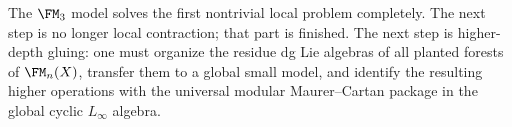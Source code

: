 \begin{remark}
The $\FM_3$ model solves the first nontrivial local problem completely.  The next
step is no longer local contraction; that part is finished.  The next step is
higher-depth gluing:
one must organize the residue dg Lie algebras of all planted forests of $\FM_n(X)$,
transfer them to a global small model, and identify the resulting higher
operations with the universal modular Maurer--Cartan package in the global cyclic
$L_\infty$ algebra.
\end{remark}
